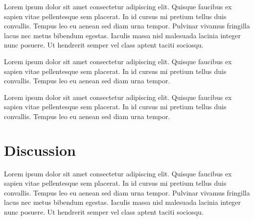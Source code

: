 \documentclass[sigconf,nonacm]{acmart} %
\begin{document}
Lorem ipsum dolor sit amet consectetur adipiscing elit. 
Quisque faucibus ex sapien vitae pellentesque sem placerat.
In id cursus mi pretium tellus duis convallis. 
Tempus leo eu aenean sed diam urna tempor.
Pulvinar vivamus fringilla lacus nec metus bibendum egestas. 
Iaculis massa nisl malesuada lacinia integer nunc posuere.
Ut hendrerit semper vel class aptent taciti sociosqu. 

Lorem ipsum dolor sit amet consectetur adipiscing elit.
Quisque faucibus ex sapien vitae pellentesque sem placerat. 
In id cursus mi pretium tellus duis convallis. 
Tempus leo eu aenean sed diam urna tempor. 



Lorem ipsum dolor sit amet consectetur adipiscing elit.
Quisque faucibus ex sapien vitae pellentesque sem placerat. 
In id cursus mi pretium tellus duis convallis. 
Tempus leo eu aenean sed diam urna tempor. 

\section{Discussion}
\label{sec:discussion}

Lorem ipsum dolor sit amet consectetur adipiscing elit. 
Quisque faucibus ex sapien vitae pellentesque sem placerat. 
In id cursus mi pretium tellus duis convallis. 
Tempus leo eu aenean sed diam urna tempor. 
Pulvinar vivamus fringilla lacus nec metus bibendum egestas. 
Iaculis massa nisl malesuada lacinia integer nunc posuere. 
Ut hendrerit semper vel class aptent taciti sociosqu. 
\end{document}
